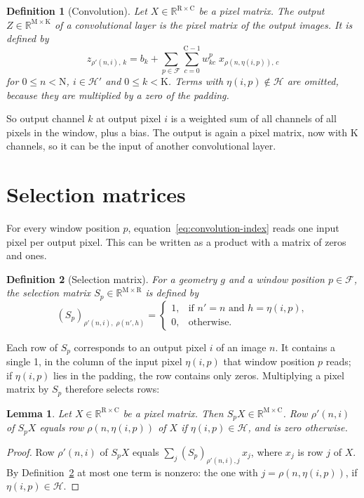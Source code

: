\documentclass[twoside,11pt]{article}
\newtheorem{lemma}{Lemma}
\newtheorem{definition}{Definition}
\newcommand{\const}[1]{\ensuremath{\mathrm{#1}}} %
\newcommand{\Reals}{\mathbb{R}}
\newcommand{\Pos}{\mathcal{F}}       %
\newcommand{\pix}{\mathcal{H}}       %
\newcommand{\outpix}{\mathcal{H}'}   %
\begin{document}
\begin{definition}[Convolution] \label{def:convolution}
Let $X \in \Reals^{\const{R} \times \const{C}}$ be a pixel matrix.
The output $Z \in \Reals^{\const{M} \times \const{K}}$ of a convolutional layer is the pixel matrix of the output images. It is defined by
\begin{equation} \label{eq:convolution-index}
z_{\rho'(n,i),\, k} = b_k + \sum_{p \in \Pos} \sum_{c = 0}^{\const{C}-1} w^{p}_{kc}\; x_{\rho(n, \eta(i,p)),\, c}
\end{equation}
for $0 \leq n < \const{N}$, $i \in \outpix$ and $0 \leq k < \const{K}$.
Terms with $\eta(i,p) \notin \pix$ are omitted, because they are multiplied by a zero of the padding.
\end{definition}
\noindent
So output channel $k$ at output pixel $i$ is a weighted sum of all channels of all pixels in the window, plus a bias.
The output is again a pixel matrix, now with $\const{K}$ channels, so it can be the input of another convolutional layer.

\section{Selection matrices} \label{section:selection-matrices}

For every window position $p$, equation~\eqref{eq:convolution-index} reads one input pixel per output pixel.
This can be written as a product with a matrix of zeros and ones.

\begin{definition}[Selection matrix] \label{def:selection-matrix}
For a geometry $g$ and a window position $p \in \Pos$, the \emph{selection matrix} $S_p \in \Reals^{\const{M} \times \const{R}}$ is defined by
\[
(S_p)_{\rho'(n,i),\; \rho(n',h)} =
\begin{cases}
1, & \text{if } n' = n \text{ and } h = \eta(i, p), \\
0, & \text{otherwise.}
\end{cases}
\]
\end{definition}
\noindent
Each row of $S_p$ corresponds to an output pixel $i$ of an image $n$.
It contains a single 1, in the column of the input pixel $\eta(i,p)$ that window position $p$ reads; if $\eta(i,p)$ lies in the padding, the row contains only zeros.
Multiplying a pixel matrix by $S_p$ therefore selects rows:

\begin{lemma} \label{lemma:selection}
Let $X \in \Reals^{\const{R} \times \const{C}}$ be a pixel matrix. Then $S_p X \in \Reals^{\const{M} \times \const{C}}$.
Row $\rho'(n,i)$ of $S_p X$ equals row $\rho(n, \eta(i,p))$ of $X$ if $\eta(i,p) \in \pix$, and is zero otherwise.
\end{lemma}
\begin{proof}
Row $\rho'(n,i)$ of $S_p X$ equals $\sum_{j} (S_p)_{\rho'(n,i), j}\, x_j$, where $x_j$ is row $j$ of $X$.
By Definition~\ref{def:selection-matrix} at most one term is nonzero: the one with $j = \rho(n, \eta(i,p))$, if $\eta(i,p) \in \pix$.
\end{proof}
\end{document}

